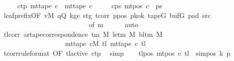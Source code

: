 \begin{isabellebody}
\ \ \ \ \ c{}{\isacharunderscore}{\kern0pt}tp{\isacharcolon}{\kern0pt}\ {\isachardoublequoteopen}mt{\isacharunderscore}{\kern0pt}tape\ c{}\ {\isacharequal}{\kern0pt}\ mt{\isacharunderscore}{\kern0pt}tape\ c{}{\isachardoublequoteclose}\isanewline
\ \ \ \ \ c{}{\isacharunderscore}{\kern0pt}ps{\isacharcolon}{\kern0pt}\ {\isachardoublequoteopen}mt{\isacharunderscore}{\kern0pt}pos\ c{}\ {\isacharequal}{\kern0pt}\ {\isacharquery}{\kern0pt}ps{\isachardoublequoteclose}\isanewline
\ \ \ \ \isamarkupfalse%
\ leaf{\isacharunderscore}{\kern0pt}prefix{\isacharbrackleft}{\kern0pt}OF\ vM\ qQ\ kge{}\ stg{}\ tcorr\ ppos\ pkok\ tapeG\ bufG\ pad{}\ src{}{\isacharcomma}{\kern0pt}\isanewline
\ \ \ \ \ \ \ \ \ \ \ \ \ \ \ \ \ \ \ \ \ \ \ \ \ \ of\ {\isacharquery}{\kern0pt}m{}{\isacharbrackright}{\kern0pt}\isanewline
\ \ \ \ \isamarkupfalse%
\ auto\isanewline
\ \ \isamarkupfalse%
\ tl{\isacharunderscore}{\kern0pt}corr{\isacharcolon}{\kern0pt}\ {\isachardoublequoteopen}ar{\isacharunderscore}{\kern0pt}tape{\isacharunderscore}{\kern0pt}correspondence\ {\isacharparenleft}{\kern0pt}{\isasymGamma}{\isacharunderscore}{\kern0pt}tm\ M{\isacharparenright}{\kern0pt}\ {\isacharparenleft}{\kern0pt}le{\isacharunderscore}{\kern0pt}tm\ M{\isacharparenright}{\kern0pt}\ {\isacharparenleft}{\kern0pt}bl{\isacharunderscore}{\kern0pt}tm\ M{\isacharparenright}{\kern0pt}\isanewline
\ \ \ \ \ \ \ \ \ \ \ \ \ \ \ \ \ \ \ {\isacharparenleft}{\kern0pt}mt{\isacharunderscore}{\kern0pt}tape\ cM\ {\isacharquery}{\kern0pt}tl{\isacharparenright}{\kern0pt}\ {\isacharparenleft}{\kern0pt}mt{\isacharunderscore}{\kern0pt}tape\ c{}\ {\isacharquery}{\kern0pt}tl{\isacharparenright}{\kern0pt}{\isachardoublequoteclose}\isanewline
\ \ \ \ \isamarkupfalse%
\ tcorr{\isacharbrackleft}{\kern0pt}rule{\isacharunderscore}{\kern0pt}format{\isacharcomma}{\kern0pt}\ OF\ tl{\isacharunderscore}{\kern0pt}active{\isacharbrackright}{\kern0pt}\ c{}{\isacharunderscore}{\kern0pt}tp\ \isamarkupfalse%
\ simp\isanewline
\ \ \isamarkupfalse%
\ tl{\isacharunderscore}{\kern0pt}pos{\isacharcolon}{\kern0pt}\ {\isachardoublequoteopen}mt{\isacharunderscore}{\kern0pt}pos\ c{}\ {\isacharquery}{\kern0pt}tl\ {\isacharequal}{\kern0pt}\ sim{\isacharunderscore}{\kern0pt}pos\ {\isacharquery}{\kern0pt}k\ {\isacharquery}{\kern0pt}p{\isachardoublequoteclose}\isanewline

\end{isabellebody}
